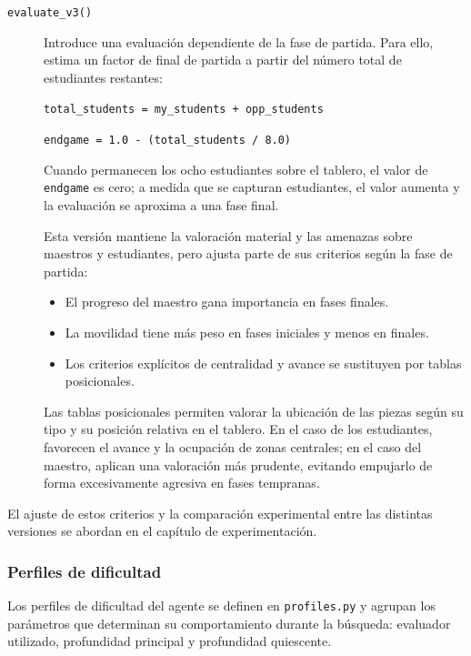 \begin{description}
    \item[\texttt{evaluate\_v3()}] Introduce una evaluación dependiente de la fase de partida. Para ello, estima un factor de final de partida a partir del número total de estudiantes restantes:

    \begin{center}
    \texttt{total\_students = my\_students + opp\_students}

    \texttt{endgame = 1.0 - (total\_students / 8.0)}
    \end{center}

    Cuando permanecen los ocho estudiantes sobre el tablero, el valor de \texttt{endgame} es cero; a medida que se capturan estudiantes, el valor aumenta y la evaluación se aproxima a una fase final.

    Esta versión mantiene la valoración material y las amenazas sobre maestros y estudiantes, pero ajusta parte de sus criterios según la fase de partida:
    \begin{itemize}
        \item El progreso del maestro gana importancia en fases finales.
        \item La movilidad tiene más peso en fases iniciales y menos en finales.
        \item Los criterios explícitos de centralidad y avance se sustituyen por tablas posicionales.
    \end{itemize}

    Las tablas posicionales permiten valorar la ubicación de las piezas según su tipo y su posición relativa en el tablero. En el caso de los estudiantes, favorecen el avance y la ocupación de zonas centrales; en el caso del maestro, aplican una valoración más prudente, evitando empujarlo de forma excesivamente agresiva en fases tempranas.
\end{description}

El ajuste de estos criterios y la comparación experimental entre las distintas versiones se abordan en el capítulo de experimentación.


\subsubsection{Perfiles de dificultad}

Los perfiles de dificultad del agente se definen en \texttt{profiles.py} y agrupan los parámetros que determinan su comportamiento durante la búsqueda: evaluador utilizado, profundidad principal y profundidad quiescente.

